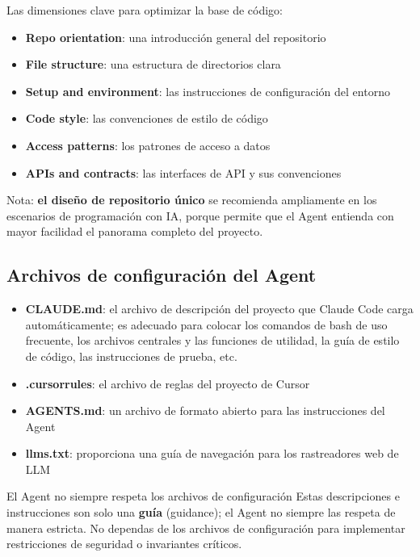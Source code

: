 \documentclass[a4paper]{article}
\begin{document}
Las dimensiones clave para optimizar la base de código:
\begin{itemize}
    \item \textbf{Repo orientation}: una introducción general del repositorio
    \item \textbf{File structure}: una estructura de directorios clara
    \item \textbf{Setup and environment}: las instrucciones de configuración del entorno
    \item \textbf{Code style}: las convenciones de estilo de código
    \item \textbf{Access patterns}: los patrones de acceso a datos
    \item \textbf{APIs and contracts}: las interfaces de API y sus convenciones
\end{itemize}

Nota: \textbf{el diseño de repositorio único} se recomienda ampliamente en los escenarios de programación con IA, porque permite que el Agent entienda con mayor facilidad el panorama completo del proyecto.

\subsection{Archivos de configuración del Agent}

\begin{itemize}
    \item \textbf{CLAUDE.md}: el archivo de descripción del proyecto que Claude Code carga automáticamente; es adecuado para colocar los comandos de bash de uso frecuente, los archivos centrales y las funciones de utilidad, la guía de estilo de código, las instrucciones de prueba, etc.
    \item \textbf{.cursorrules}: el archivo de reglas del proyecto de Cursor
    \item \textbf{AGENTS.md}: un archivo de formato abierto para las instrucciones del Agent
    \item \textbf{llms.txt}: proporciona una guía de navegación para los rastreadores web de LLM
\end{itemize}

\begin{warningbox}{El Agent no siempre respeta los archivos de configuración}
Estas descripciones e instrucciones son solo una \textbf{guía} (guidance); el Agent no siempre las respeta de manera estricta. No dependas de los archivos de configuración para implementar restricciones de seguridad o invariantes críticos.
\end{warningbox}
\end{document}
